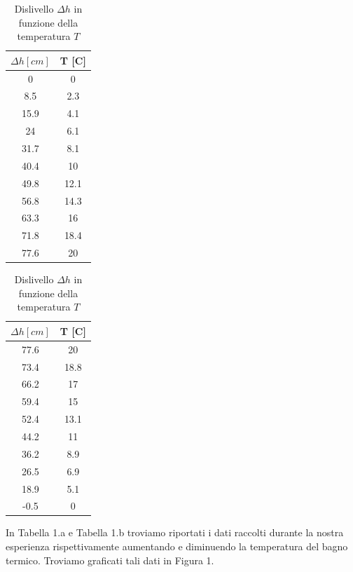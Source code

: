 \begin{table}[H]
\centering
	\begin{subtable}{.5\textwidth}
		\centering
		\begin{tabular}{|c|c|} \hline
			\textbf{$\Delta h {[cm]}$ } & \textbf{T {[\degree C]} }  \\ \hline
			0 & 0  \\ \hline
			8.5 & 2.3  \\ \hline
			15.9 & 4.1  \\ \hline
			24 & 6.1  \\ \hline
			31.7 & 8.1  \\ \hline
			40.4 & 10  \\ \hline
			49.8 & 12.1  \\ \hline
			56.8 & 14.3  \\ \hline
			63.3 & 16  \\ \hline
			71.8 & 18.4  \\ \hline
			77.6 & 20  \\ \hline
		\end{tabular}
		\caption{Aumento della temperatura}
	\end{subtable}%
	\begin{subtable}{.5\textwidth}
	\centering
	\begin{tabular}{|c|c|} \hline
		\textbf{$\Delta h {[cm]}$ } & \textbf{T {[\degree C]} }  \\ \hline
		77.6 & 20  \\ \hline
		73.4 & 18.8  \\ \hline
		66.2 & 17  \\ \hline
		59.4 & 15  \\ \hline
		52.4 & 13.1  \\ \hline
		44.2 & 11  \\ \hline
		36.2 & 8.9  \\ \hline
		26.5 & 6.9  \\ \hline
		18.9 & 5.1  \\ \hline
		-0.5 & 0  \\ \hline
	\end{tabular}
	\caption{Diminuzione della temperatura}
\end{subtable}

\caption{Dislivello $\Delta h$ in funzione della temperatura $T$}
\end{table}
In Tabella 1.a e Tabella 1.b troviamo riportati i dati raccolti durante la nostra esperienza rispettivamente aumentando e diminuendo la temperatura del bagno termico.
Troviamo graficati tali dati in Figura 1. 

